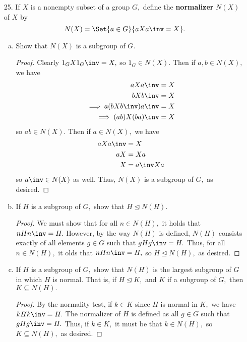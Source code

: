 \documentclass{article}
\begin{document}
\begin{itemize}
\begin{proof}
		\end{proof}

	\item[25.] If $X$ is a nonempty subset of a group $G,$ define the \textbf{normalizer} $N(X)$ of $X$ by \[N(X)=\Set{a\in G}{aXa\inv=X}.\]
		\begin{enumerate}[(a)]
			\item Show that $N(X)$ is a subgroup of $G.$
				\begin{proof}
					Clearly $1_GX1_G\inv=X,$ so $1_G\in N(X).$ Then if $a, b\in N(X),$ we have 
					\begin{align*}
						aXa\inv &= X \\
						bXb\inv &= X \\
						\implies a(bXb\inv)a\inv &= X \\
						\implies (ab)X(ba)\inv &= X
					\end{align*} so $ab\in N(X).$ Then if $a\in N(X),$ we have 
					\begin{align*}
						aXa\inv &= X \\
						aX &= Xa \\
						X &= a\inv Xa
					\end{align*} so $a\inv\in N(X)$ as well. Thus, $N(X)$ is a subgroup of $G,$ as desired.
					
				\end{proof}

			\item If $H$ is a subgroup of $G,$ show that $H\unlhd N(H).$
				\begin{proof}
					We must show that for all $n\in N(H),$ it holds that $nHn\inv=H.$ However, by the way $N(H)$ is defined, $N(H)$ consists exactly of all elements $g\in G$ such that $gHg\inv=H.$ Thus, for all $n\in N(H),$ it olds that $nHn\inv=H,$ so $H\unlhd N(H),$ as desired.
					
				\end{proof}

			\item If $H$ is a subgroup of $G,$ show that $N(H)$ is the largest subgroup of $G$ in which $H$ is normal. That is, if $H\unlhd K,$ and $K$ if a subgroup of $G,$ then $K\subseteq N\left( H \right).$
				\begin{proof}
					By the normality test, if $k\in K$ since $H$ is normal in $K,$ we have $kHk\inv= H.$ The normalizer of $H$ is defined as all $g\in G$ such that $gHg\inv=H.$ Thus, if $k\in K,$ it must be that $k\in N(H),$ so $K\subseteq N(H),$ as desired.
					
				\end{proof}
				
		\end{enumerate}
		
\end{itemize}
\end{document}
